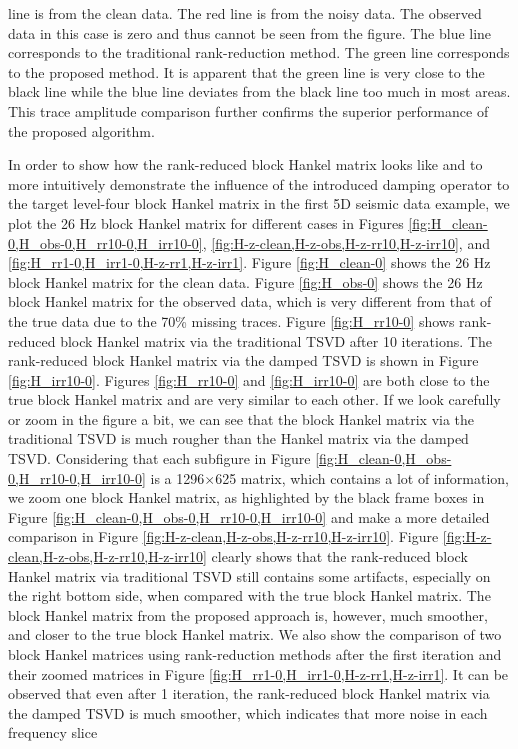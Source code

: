 line is from the clean data. The red line is from the noisy data. The observed data in this case is zero and thus cannot be seen from the figure. The blue line corresponds to the traditional rank-reduction method. The green line corresponds to the proposed method. It is apparent that the green line is very close to the black line while the blue line deviates from the black line too much in most areas. This trace amplitude comparison  further confirms the superior performance of the proposed algorithm. 

In order to show how the rank-reduced block Hankel matrix looks like and to more intuitively demonstrate the influence of the introduced damping operator to the target level-four block Hankel matrix in the first 5D seismic data example, we plot the 26 Hz block Hankel matrix for different  cases in Figures \ref{fig:H_clean-0,H_obs-0,H_rr10-0,H_irr10-0}, \ref{fig:H-z-clean,H-z-obs,H-z-rr10,H-z-irr10}, and \ref{fig:H_rr1-0,H_irr1-0,H-z-rr1,H-z-irr1}. Figure \ref{fig:H_clean-0} shows the 26 Hz block Hankel matrix for the clean data.  Figure \ref{fig:H_obs-0} shows the 26 Hz block Hankel matrix for the observed data, which is very different from that of the true data due to the 70\% missing traces. Figure \ref{fig:H_rr10-0} shows rank-reduced block Hankel matrix via the traditional TSVD after 10 iterations.  The rank-reduced block Hankel matrix via the damped TSVD is shown in Figure \ref{fig:H_irr10-0}. Figures \ref{fig:H_rr10-0} and \ref{fig:H_irr10-0} are both close to the true block Hankel matrix and are very similar to each other. If we look carefully or zoom in the figure a bit, we can see that the block Hankel matrix via the traditional TSVD is much rougher than the Hankel matrix via the damped TSVD. Considering that each subfigure in Figure \ref{fig:H_clean-0,H_obs-0,H_rr10-0,H_irr10-0} is a 1296$\times$625 matrix, which contains a lot of information, we zoom one block Hankel matrix, as highlighted by the black frame boxes in Figure \ref{fig:H_clean-0,H_obs-0,H_rr10-0,H_irr10-0} and make a more detailed comparison in Figure \ref{fig:H-z-clean,H-z-obs,H-z-rr10,H-z-irr10}. Figure \ref{fig:H-z-clean,H-z-obs,H-z-rr10,H-z-irr10} clearly shows that the rank-reduced block Hankel matrix via traditional TSVD still contains some artifacts, especially on the right bottom side, when compared with the true block Hankel matrix. The block Hankel matrix from the proposed approach is, however, much smoother, and closer to the true block Hankel matrix. We also show the comparison of two block Hankel matrices using rank-reduction methods after the first iteration and their zoomed matrices in Figure \ref{fig:H_rr1-0,H_irr1-0,H-z-rr1,H-z-irr1}. It can be observed that even after 1 iteration, the rank-reduced block Hankel matrix via the damped TSVD is much smoother, which indicates that more noise in each frequency slice
